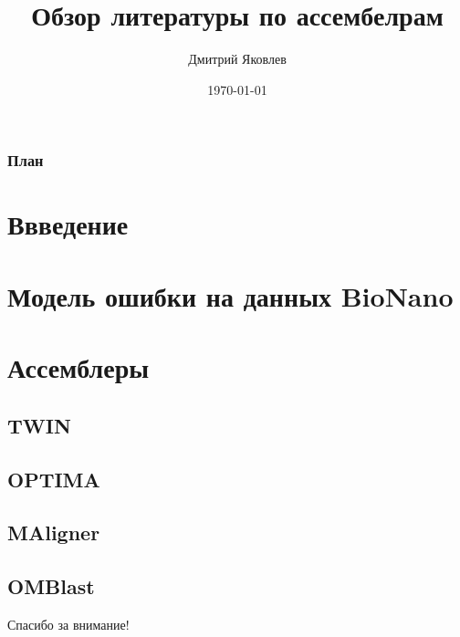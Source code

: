 \documentclass{beamer}
\title[Обзор литературы по ассембелрам]{Обзор литературы по ассембелрам}
\author{Дмитрий Яковлев}
\institute{EPAM Systems}
\date{\today}
\begin{document}
\graphicspath{{./img/}}

\begin{frame}
  \titlepage
\end{frame}

\begin{frame}
\frametitle{План}
\tableofcontents
\end{frame}

\section{Ввведение}


\section{Модель ошибки на данных BioNano}


\section{Ассемблеры}

\subsection{TWIN}


\subsection{OPTIMA}


\subsection{MAligner}


\subsection{OMBlast}





\begin{frame}

\begin{center}
\Huge Спасибо за внимание!
\end{center}

\end{frame}
\end{document}

